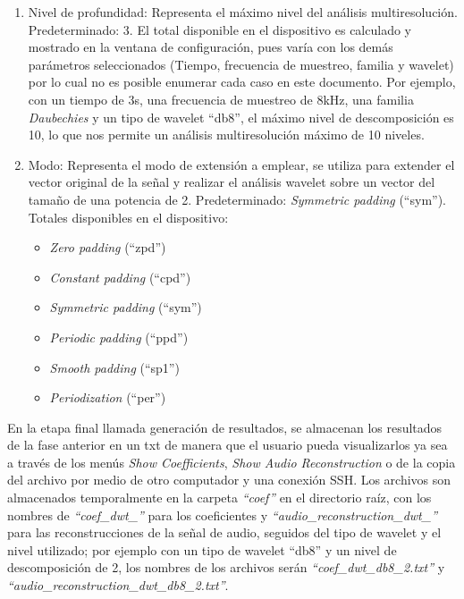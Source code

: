 \documentclass[11pt,lettersize]{article} %
\begin{document}
\begin{enumerate}
	\item Nivel de profundidad: Representa el máximo nivel del análisis multiresolución. Predeterminado: 3. El total disponible en el dispositivo es calculado y mostrado en la ventana de configuración, pues varía con los demás parámetros seleccionados (Tiempo, frecuencia de muestreo, familia y wavelet) por lo cual no es posible enumerar cada caso en este documento. Por ejemplo, con un tiempo de 3s, una frecuencia de muestreo de 8kHz, una familia \textit{Daubechies} y un tipo de wavelet ``db8'', el máximo nivel de descomposición es 10, lo que nos permite un análisis multiresolución máximo de 10 niveles.

	\item Modo: Representa el modo de extensión a emplear, se utiliza para extender el vector original de la señal y realizar el análisis wavelet sobre un vector del tamaño de una potencia de 2. Predeterminado: \textit{Symmetric padding} (``sym''). Totales disponibles en el dispositivo:
	\begin{multicols}{2}
		\begin{itemize}
			\item \textit{Zero padding} (``zpd'')
			\item \textit{Constant padding} (``cpd'')
			\item \textit{Symmetric padding} (``sym'')
			\item \textit{Periodic padding} (``ppd'')
			\item \textit{Smooth padding} (``sp1'')
			\item \textit{Periodization} (``per'')
		\end{itemize}
	\end{multicols}
\end{enumerate}

En la etapa final llamada generación de resultados, se almacenan los resultados de la fase anterior en un txt de manera que el usuario pueda visualizarlos ya sea a través de los menús \textit{Show Coefficients}, \textit{Show Audio Reconstruction} o de la copia del archivo por medio de otro computador y una conexión SSH. Los archivos son almacenados temporalmente en la carpeta \textit{``coef''} en el directorio raíz, con los nombres de \textit{``coef\_dwt\_''} para los coeficientes y \textit{``audio\_reconstruction\_dwt\_''} para las reconstrucciones de la señal de audio, seguidos del tipo de wavelet y el nivel utilizado; por ejemplo con un tipo de wavelet ``db8'' y un nivel de descomposición de 2, los nombres de los archivos serán \textit{``coef\_dwt\_db8\_2.txt''} y \textit{``audio\_reconstruction\_dwt\_db8\_2.txt''}. \\
\end{document}
